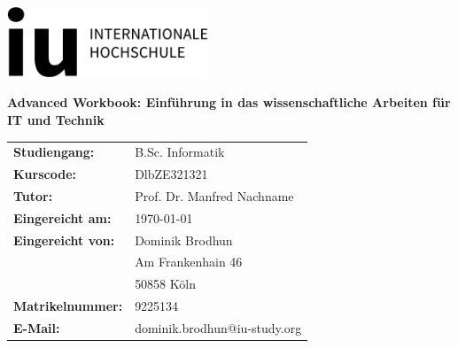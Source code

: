 \begin{titlepage}
	\thispagestyle{empty}

	\begin{flushright}
		\includegraphics[width=6cm]{logo.jpg}
	\end{flushright}

	\vfill

	\begin{center}
		{\LARGE\bfseries Advanced Workbook: Einführung in das wissenschaftliche Arbeiten für IT und Technik\par}
	\end{center}

	\vfill

	\begin{tabular}{@{}l l}
		\textbf{Studiengang:}     & B.Sc. Informatik             \\
		\textbf{Kurscode:}        & DlbZE321321                  \\
		\textbf{Tutor:}           & Prof. Dr. Manfred Nachname   \\[2em]

		\textbf{Eingereicht am:}  & \today                       \\[2em]
		\textbf{Eingereicht von:} & Dominik Brodhun              \\
		                          & Am Frankenhain 46            \\
		                          & 50858 Köln                   \\[0.5em]
		\textbf{Matrikelnummer:}  & 9225134                      \\
		\textbf{E-Mail:}          & dominik.brodhun@iu-study.org \\
	\end{tabular}

\end{titlepage}

